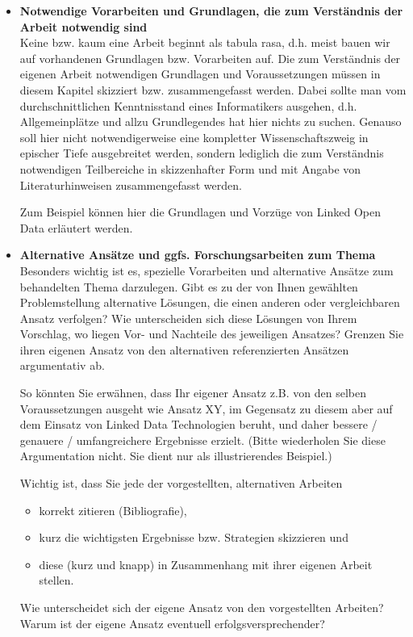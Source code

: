 \begin{itemize}
\item {\bf Notwendige Vorarbeiten und Grundlagen, die zum Verständnis der Arbeit notwendig sind}\\
Keine bzw. kaum eine Arbeit beginnt als \glqq tabula rasa\grqq , d.h. meist bauen wir auf  vorhandenen Grundlagen bzw. Vorarbeiten auf.
Die zum Verständnis der eigenen Arbeit notwendigen Grundlagen und Voraussetzungen müssen in diesem Kapitel skizziert bzw. zusammengefasst werden.
Dabei sollte man vom durchschnittlichen Kenntnisstand eines Informatikers ausgehen, d.h. Allgemeinplätze und allzu Grundlegendes hat hier nichts zu suchen.
Genauso soll hier nicht notwendigerweise eine kompletter Wissenschaftszweig in epischer Tiefe ausgebreitet werden, sondern lediglich die zum Verständnis notwendigen Teilbereiche in skizzenhafter Form und mit Angabe von Literaturhinweisen zusammengefasst werden. 

\smallskip

Zum Beispiel können hier die Grundlagen und Vorzüge von Linked Open Data erläutert werden.

\smallskip

\item {\bf Alternative Ansätze und ggfs. Forschungsarbeiten zum Thema}\\
Besonders wichtig ist es, spezielle Vorarbeiten und alternative Ansätze zum behandelten Thema darzulegen.
Gibt es zu der von Ihnen gewählten Problemstellung alternative Lösungen, die einen anderen oder vergleichbaren Ansatz verfolgen? Wie unterscheiden sich diese Lösungen von Ihrem Vorschlag, wo liegen Vor- und Nachteile des jeweiligen Ansatzes? Grenzen Sie ihren eigenen Ansatz von den alternativen referenzierten Ansätzen argumentativ ab.

\smallskip

So könnten Sie erwähnen, dass Ihr eigener Ansatz z.B. von den selben Voraussetzungen ausgeht wie Ansatz XY, im Gegensatz zu diesem aber auf dem Einsatz von Linked Data Technologien beruht, und daher bessere / genauere / umfangreichere Ergebnisse erzielt. (Bitte wiederholen Sie diese Argumentation nicht. Sie dient nur als illustrierendes Beispiel.)

Wichtig ist, dass Sie jede der vorgestellten, alternativen Arbeiten 
\begin{itemize}
\item korrekt zitieren (Bibliografie),
\item kurz die wichtigsten Ergebnisse bzw. Strategien skizzieren und
\item diese (kurz und knapp) in Zusammenhang mit ihrer eigenen Arbeit stellen. 
\end{itemize}
Wie unterscheidet sich der eigene Ansatz von den vorgestellten Arbeiten? 
Warum ist der eigene Ansatz eventuell erfolgsversprechender? 

\end{itemize}

